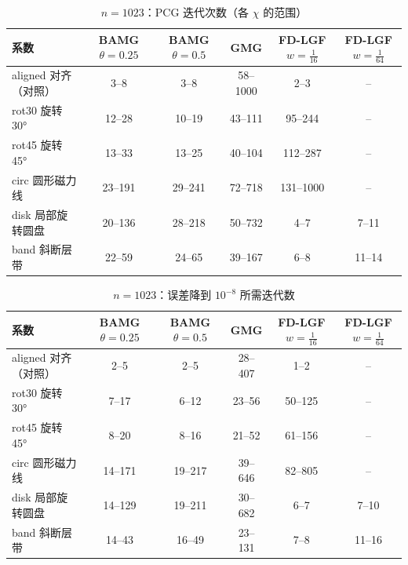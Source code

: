 \begin{table}[H]\centering\small
\caption{$n=1023$：PCG 迭代次数（各 $\chi$ 的范围）}\label{tab:its}
\begin{tabular}{lccccc}
\toprule
系数 & BAMG $\theta{=}0.25$ & BAMG $\theta{=}0.5$ & GMG & FD-LGF $w{=}\frac1{16}$ & FD-LGF $w{=}\frac1{64}$ \\
\midrule
aligned 对齐（对照） & 3--8 & 3--8 & 58--1000 & 2--3 & -- \\
rot30 旋转 30° & 12--28 & 10--19 & 43--111 & 95--244 & -- \\
rot45 旋转 45° & 13--33 & 13--25 & 40--104 & 112--287 & -- \\
circ 圆形磁力线 & 23--191 & 29--241 & 72--718 & 131--1000 & -- \\
disk 局部旋转圆盘 & 20--136 & 28--218 & 50--732 & 4--7 & 7--11 \\
band 斜断层带 & 22--59 & 24--65 & 39--167 & 6--8 & 11--14 \\
\bottomrule
\end{tabular}
\end{table}

\begin{table}[H]\centering\small
\caption{$n=1023$：误差降到 $10^{-8}$ 所需迭代数}\label{tab:k8}
\begin{tabular}{lccccc}
\toprule
系数 & BAMG $\theta{=}0.25$ & BAMG $\theta{=}0.5$ & GMG & FD-LGF $w{=}\frac1{16}$ & FD-LGF $w{=}\frac1{64}$ \\
\midrule
aligned 对齐（对照） & 2--5 & 2--5 & 28--407 & 1--2 & -- \\
rot30 旋转 30° & 7--17 & 6--12 & 23--56 & 50--125 & -- \\
rot45 旋转 45° & 8--20 & 8--16 & 21--52 & 61--156 & -- \\
circ 圆形磁力线 & 14--171 & 19--217 & 39--646 & 82--805 & -- \\
disk 局部旋转圆盘 & 14--129 & 19--211 & 30--682 & 6--7 & 7--10 \\
band 斜断层带 & 14--43 & 16--49 & 23--131 & 7--8 & 11--16 \\
\bottomrule
\end{tabular}
\end{table}

